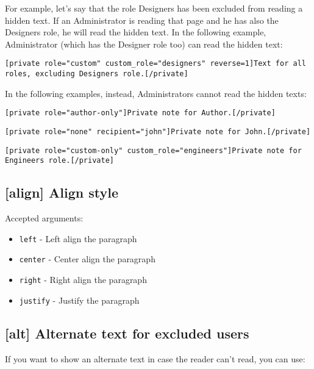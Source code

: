 \documentclass[a4paper,10pt]{article}
\begin{document}
For example, let's say that the role Designers has been excluded from reading a hidden text. If an Administrator is reading that page and he has also the Designers role, he will read the hidden text. In the following example, Administrator (which has the Designer role too) can read the hidden text:

\begin{lstlisting}
[private role="custom" custom_role="designers" reverse=1]Text for all roles, excluding Designers role.[/private]
\end{lstlisting}

In the following examples, instead, Administrators cannot read the hidden texts:

\begin{lstlisting}
[private role="author-only"]Private note for Author.[/private]
\end{lstlisting}

\begin{lstlisting}
[private role="none" recipient="john"]Private note for John.[/private]
\end{lstlisting}

\begin{lstlisting}
[private role="custom-only" custom_role="engineers"]Private note for Engineers role.[/private]
\end{lstlisting}

\subsection{[align] Align style}

Accepted arguments:

\begin{itemize}
 \item \verb+left+ - Left align the paragraph
 \item \verb+center+ - Center align the paragraph
 \item \verb+right+ - Right align the paragraph
 \item \verb+justify+ - Justify the paragraph
\end{itemize}

\subsection{[alt] Alternate text for excluded users}

If you want to show an alternate text in case the reader can't read, you can use:
\end{document}
